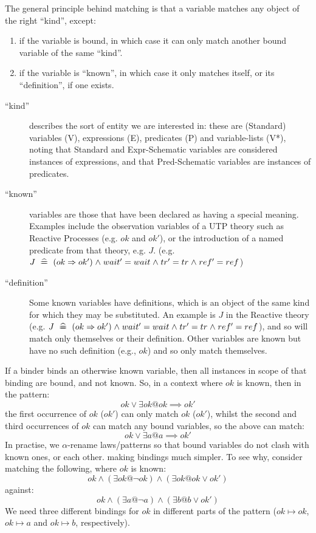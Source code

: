 The general principle behind matching is that a variable matches
any object of the right ``kind'', except:
\begin{enumerate}
  \item
    if the variable is bound, in which case it can only match another bound variable of the same ``kind''.
  \item
    if the variable is ``known'',
    in which case it only matches itself, or its ``definition'', if one exists.
\end{enumerate}
\begin{description}
  \item[``kind'']
    describes the sort of entity we are interested in: these are (Standard) variables (\textsf{V}),
    expressions (\textsf{E}), predicates (\textsf{P}) and  variable-lists (\textsf{V*}),
    noting that Standard and Expr-Schematic variables are considered instances of expressions,
    and that Pred-Schematic variables are instances of predicates.
  \item[``known'']
    variables are those that have been declared as having a special meaning.
    Examples include the observation variables of a UTP theory such as Reactive Processes (e.g. $ok$ and $ok'$),
    or the introduction of a named predicate from that theory, e.g. $J$.
    (e.g. $J \mathrel{~\widehat{=\!\!\!\!=}}~ (ok\Rightarrow ok') \mathrel{\wedge} wait'=wait \mathrel{\wedge} tr'=tr \mathrel{\wedge} ref'=ref$)
  \item[``definition'']
    Some known variables have definitions, which is an object of the same kind
    for which they may be substituted.
    An example is $J$ in the Reactive theory
    (e.g. $J \mathrel{~\widehat{=\!\!\!\!=}}~ (ok\Rightarrow ok') \mathrel{\wedge} wait'=wait \mathrel{\wedge} tr'=tr \mathrel{\wedge} ref'=ref$),
    and so will match only themselves or their definition.
    Other variables are known but have no such definition (e.g., $ok$) and so only match themselves.
\end{description}
If a binder binds an otherwise known variable,
then all instances in scope of that binding are bound, and not known.
So, in a context where $ok$ is known, then in the
pattern:
$$
ok \lor \exists ok @ ok \implies ok'
$$
the first occurrence of $ok$ ($ ok'$) can only match $ok$ ($ok'$), whilst the
second and third occurrences of $ok$ can match any bound variables, so the
above can match:
$$
ok \lor \exists a @ a \implies ok'
$$
In practise, we $\alpha$-rename laws/patterns so that bound variables
do not clash with known ones, or each other. making bindings much simpler.
To see why, consider matching the following, where $ok$ is known:
$$
ok \land (\exists ok @ \lnot ok) \land (\exists ok @ ok \lor ok')
$$
against:
$$
ok \land (\exists a @ \lnot a) \land (\exists b @ b \lor ok')
$$
We need three different bindings for $ok$ in different parts of the pattern
($ok \mapsto ok$, $ok \mapsto a$ and $ok \mapsto b$, respectively).

